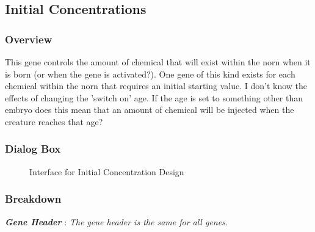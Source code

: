 \documentclass[11pt,twoside,a4paper]{article}
\begin{document}


\subsection{Initial Concentrations} %
\begin{minipage}{0.5\linewidth}
\subsubsection{Overview}
This gene controls the amount of chemical that will exist within the norn when it is born (or when the gene is activated?). One gene of this kind exists for each chemical within the norn that requires an initial starting value. I don't know the effects of changing the 'switch on' age. If the age is set to something other than embryo does this mean that an amount of chemical will be injected when the creature reaches that age?~\\
\end{minipage}
\begin{minipage}{0.1\linewidth}\end{minipage}
\begin{minipage}{0.4\linewidth}
\subsubsection{Dialog Box}
\begin{figure}[H]
	\centerline {} %
	\caption{Interface for Initial Concentration Design}
	\label{fig:chemical_initial}
\end{figure}
\end{minipage}

\subsubsection{Breakdown}

\textbf{\textit{Gene Header}} : \emph{The gene header is the same for all genes.}~\\
\end{document}
